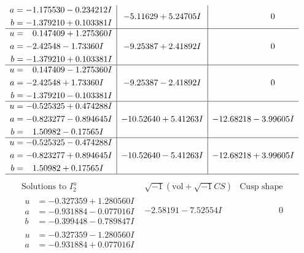 \documentclass[1p]{elsarticle_modified}
\theoremstyle{definition}
\newcommand{\I}{\sqrt{-1}}
\begin{document}
$$\begin{array}{c|c|c}
\begin{aligned}
a &= -1.175530 - 0.234212 I \\
b &= -1.379210 + 0.103381 I\end{aligned}
 & -5.11629 + 5.24705 I & \phantom{-0.000000 } 0 \\ \hline\begin{aligned}
u &= \phantom{-}0.147409 + 1.275360 I \\
a &= -2.42548 - 1.73360 I \\
b &= -1.379210 + 0.103381 I\end{aligned}
 & -9.25387 + 2.41892 I & \phantom{-0.000000 } 0 \\ \hline\begin{aligned}
u &= \phantom{-}0.147409 - 1.275360 I \\
a &= -2.42548 + 1.73360 I \\
b &= -1.379210 - 0.103381 I\end{aligned}
 & -9.25387 - 2.41892 I & \phantom{-0.000000 } 0 \\ \hline\begin{aligned}
u &= -0.525325 + 0.474288 I \\
a &= -0.823277 - 0.894645 I \\
b &= \phantom{-}1.50982 - 0.17565 I\end{aligned}
 & -10.52640 + 5.41263 I & -12.68218 - 3.99605 I \\ \hline\begin{aligned}
u &= -0.525325 - 0.474288 I \\
a &= -0.823277 + 0.894645 I \\
b &= \phantom{-}1.50982 + 0.17565 I\end{aligned}
 & -10.52640 - 5.41263 I & -12.68218 + 3.99605 I\\
 \hline 
 \end{array}$$\newpage$$\begin{array}{c|c|c}  
\text{Solutions to }I^u_{2}& \I (\text{vol} + \sqrt{-1}CS) & \text{Cusp shape}\\
 \hline 
\begin{aligned}
u &= -0.327359 + 1.280560 I \\
a &= -0.931884 - 0.077016 I \\
b &= -0.399448 - 0.789847 I\end{aligned}
 & -2.58191 - 7.52554 I & \phantom{-0.000000 } 0 \\ \hline\begin{aligned}
u &= -0.327359 - 1.280560 I \\
a &= -0.931884 + 0.077016 I \\

\end{aligned}
\end{array}$$
\end{document}
